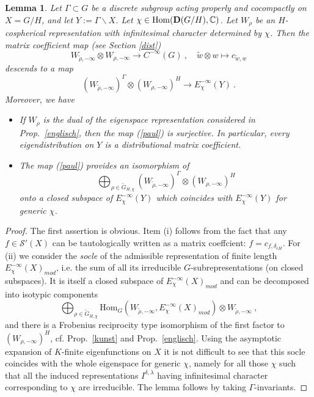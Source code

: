\documentclass[10]{amsart}
\newtheorem{lem}[thm]{Lemma}
\theoremstyle{remark}
\theoremstyle{definition}
\numberwithin{equation}{section}
\newcommand{\C}{\mathbb{C}}           %
\newcommand{\Hom}{\mathrm{Hom}}
\newcommand{\Cal}{\mathcal}
\newcommand{\be}{\begin{equation}}
\begin{document}
{\begin{lem}\label{otto}
Let $\Gamma\subset G$ be a discrete subgroup acting properly and cocompactly on $X=G/H$, and let $Y:=\Gamma\backslash X$. Let $\chi\in\Hom({\bf D}(G/H),\C)$. 
Let $W_\rho$ be an $H$-cospherical representation with infinitesimal character determined by $\chi$. Then the matrix coefficient map (see Section \ref{dist})
$$  W_{\tilde\rho,-\infty}\otimes W_{\rho,-\infty}\longrightarrow C^{-\infty}(G)\ ,\quad \tilde w\otimes w\mapsto c_{\tilde w,w}$$
descends to a map
\be\label{paul}
 (W_{\tilde \rho,-\infty})^\Gamma\otimes (W_{\rho,-\infty})^H\longrightarrow  E^{-\infty}_\chi(Y)\ .
\end{equation}
Moreover, we have
\begin{itemize}
\item[(i)] If $W_\rho$ is the dual of the eigenspace representation considered in Prop.~\ref{englisch}, then the map (\ref{paul}) is surjective. In particular, every eigendistribution on
$Y$ is a distributional matrix coefficient.
\item[(ii)] The map (\ref{paul}) provides an isomorphism of
$$ \bigoplus_{\rho\in \widetilde G_{H,\chi}} (W_{\tilde \rho,-\infty})^\Gamma\otimes (W_{\rho,-\infty})^H$$
onto a closed subspace of  $E^{-\infty}_\chi(Y)$ which coincides with $E^{-\infty}_\chi(Y)$ for generic $\chi$.
\end{itemize}
\end{lem} 
\begin{proof} The first assertion is obvious. Item (i) follows from the fact that any $f\in {\Cal S}'(X)$ can be tautologically written as a matrix coeffcient: $f=c_{f,\delta_{eH}}$.
For (ii) we consider the {\em socle} of the admissible representation of finite length $E^{-\infty}_\chi(X)_{mod}$, i.e. the sum of all its irreducible $G$-subrepresentations (on closed subspaces). It is itself a closed subspace of $E^{-\infty}_\chi(X)_{mod}$ and can be decomposed into isotypic components
$$   \bigoplus_{\rho\in \widetilde G_{H,\chi}} \Hom_G(W_{\tilde \rho,-\infty}, E^{-\infty}_\chi(X)_{mod})\otimes W_{\tilde \rho,-\infty}\ ,$$
and there is a Frobenius reciprocity type isomorphism of the first factor to $(W_{\rho,-\infty})^H$, cf. Prop.~\ref{kunst} and Prop.~\ref{englisch}.
Using the asymptotic expansion of $K$-finite eigenfunctions on $X$ it is not difficult to see that this socle coincides with the whole eigenspace for generic $\chi$, namely for all those
$\chi$ such that all the induced representations $I^{\delta,\lambda}$ having infinitesimal character corresponding to $\chi$ are irreducible. The lemma follows by taking $\Gamma$-invariants.

\end{proof}}
\end{document}
